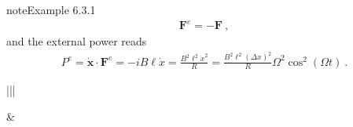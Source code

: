\documentclass[letterpaper,10pt,english]{jupyterBook}
\begin{document}
\begin{sphinxadmonition}{note}{Example 6.3.1}
\begin{equation*}
\begin{split}\mathbf{F}^e = - \mathbf{F} \ ,\end{split}
\end{equation*}
\sphinxAtStartPar
and the external power reads
\begin{equation*}
\begin{split}P^e = \dot{\mathbf{x}} \cdot \mathbf{F}^e = - i B \ell \dot{x} = \frac{B^2 \ell^2 \dot{x}^2}{R} = \frac{B^2 \ell^2 \left(\Delta x\right)^2}{R} \Omega^2 \cos^2(\Omega t) \ .\end{split}
\end{equation*}

\begin{savenotes}\sphinxattablestart
\centering
\begin{tabular}[t]{|||}
\hline

\sphinxAtStartPar
{}
&
\sphinxAtStartPar
{}
\\
\hline
\end{tabular}
\par
\sphinxattableend\end{savenotes}


\end{sphinxadmonition}
\end{document}
